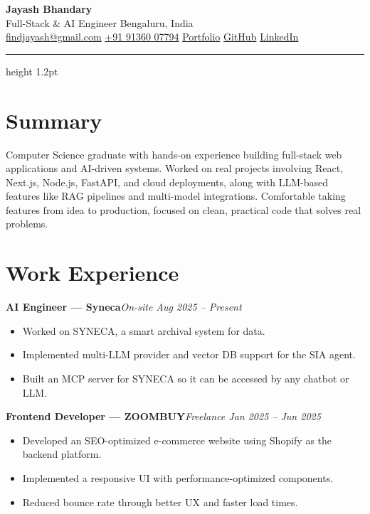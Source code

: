 \documentclass[a4paper,10pt]{article}
\newcommand{\entry}[2]{%
    \textbf{#1}\hfill{\small\color{faint}\textit{#2}}\par%
}
\begin{document}
\begin{center}
    {\Huge\bfseries Jayash Bhandary}\\[3pt]
    {\color{soft}Full-Stack \& AI Engineer \textbullet{} Bengaluru, India}\\[5pt]
    {\small
    \href{mailto:findjayash@gmail.com}{findjayash@gmail.com} \textbullet{}
    \href{tel:+919136007794}{+91 91360 07794} \textbullet{}
    \href{https://jayashbhandary.github.io}{Portfolio} \textbullet{}
    \href{https://github.com/JayashBhandary}{GitHub} \textbullet{}
    \href{https://www.linkedin.com/in/jayashbhandary}{LinkedIn}}
\end{center}
\vspace{-2pt}
{\color{soft}\hrule height 1.2pt}
\vspace{2pt}

\section*{Summary}
Computer Science graduate with hands-on experience building full-stack web applications and
AI-driven systems. Worked on real projects involving React, Next.js, Node.js, FastAPI, and cloud
deployments, along with LLM-based features like RAG pipelines and multi-model integrations.
Comfortable taking features from idea to production, focused on clean, practical code that solves
real problems.

\section*{Work Experience}

\entry{AI Engineer --- Syneca}{On-site \textbullet{} Aug 2025 -- Present}
\begin{itemize}
    \item Worked on SYNECA, a smart archival system for data.
    \item Implemented multi-LLM provider and vector DB support for the SIA agent.
    \item Built an MCP server for SYNECA so it can be accessed by any chatbot or LLM.
\end{itemize}
\vspace{4pt}

\entry{Frontend Developer --- ZOOMBUY}{Freelance \textbullet{} Jan 2025 -- Jun 2025}
\begin{itemize}
    \item Developed an SEO-optimized e-commerce website using Shopify as the backend platform.
    \item Implemented a responsive UI with performance-optimized components.
    \item Reduced bounce rate through better UX and faster load times.
\end{itemize}
\vspace{4pt}
\end{document}
